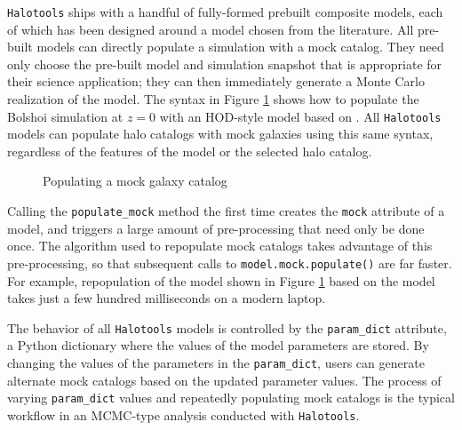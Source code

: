 \documentclass[twocolumn, tighten]{aastex6}
\begin{document}
{\tt Halotools} ships with a handful of fully-formed prebuilt composite models, each of which has been designed around a model chosen from the literature. All pre-built models can directly populate a simulation with a mock catalog. They need only choose the pre-built model and simulation snapshot that is appropriate for their science application; they can then immediately generate a Monte Carlo realization of the model. The syntax in Figure \ref{code:mockpop} shows how to populate the Bolshoi simulation at $z=0$ with an HOD-style model based on \citet{leauthaud11b}. All {\tt Halotools} models can populate halo catalogs with mock galaxies using this same syntax, regardless of the features of the model or the selected halo catalog.

 \begin{figure}
\center
\caption{Populating a mock galaxy catalog\label{code:mockpop}}
\vspace{0.1in}
\end{figure}

Calling the {\tt populate\_mock} method the first time creates the {\tt mock} attribute of a model, and triggers a large amount of pre-processing that need only be done once. The algorithm used to repopulate mock catalogs takes advantage of this pre-processing, so that subsequent calls to {\tt model.mock.populate()} are far faster. For example, repopulation of the model shown in Figure \ref{code:mockpop} based on the \citet{leauthaud11b} model takes just a few hundred milliseconds on a modern laptop.

The behavior of all {\tt Halotools} models is controlled by the {\tt param\_dict} attribute, a Python dictionary where the values of the model parameters are stored. By changing the values of the parameters in the {\tt param\_dict}, users can generate alternate mock catalogs based on the updated parameter values. The process of varying {\tt param\_dict} values and repeatedly populating mock catalogs is the typical workflow in an MCMC-type analysis conducted with {\tt Halotools}.
\end{document}
